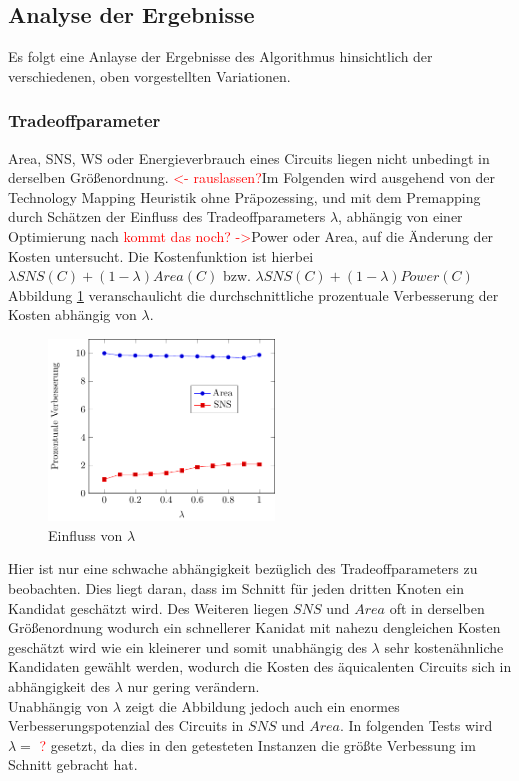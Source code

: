 \documentclass[11pt, a4paper, german]{article}
\newcommand{\TM}{Technology  Mapping }
\begin{document}
 \subsection{Analyse der Ergebnisse}
 \label{subsec:analyse_der_ergebnisse}
 Es folgt eine Anlayse der Ergebnisse des Algorithmus hinsichtlich der verschiedenen, oben vorgestellten Variationen.
\subsubsection{Tradeoffparameter}
Area, SNS, WS oder Energieverbrauch eines Circuits liegen nicht unbedingt in derselben Größenordnung. \textcolor{red}{<- rauslassen?}Im Folgenden wird ausgehend von der \TM Heuristik ohne Präpozessing, und mit dem Premapping durch Sch\"atzen der Einfluss des Tradeoffparameters $\lambda$, abhängig von einer Optimierung nach \textcolor{red}{kommt das noch? ->}Power oder Area,  auf die Änderung der Kosten untersucht.  Die Kostenfunktion ist hierbei $\lambda SNS(C) + (1-\lambda)Area(C)$ bzw. $\lambda SNS(C) + (1-\lambda)Power(C)$\\
Abbildung \ref{bild:area_slack_tradeoff} veranschaulicht die durchschnittliche prozentuale Verbesserung der Kosten abhängig von $\lambda$.\\
   \begin{figure}
		\includegraphics[width = 6cm]{pictures/tex_files/analysis/tradeoff_curve}
		\caption{Einfluss von $\lambda$}
		\label{bild:area_slack_tradeoff}
	\end{figure}
Hier ist nur eine schwache abh\"angigkeit bez\"uglich des Tradeoffparameters zu beobachten. Dies liegt daran, dass im Schnitt f\"ur jeden dritten Knoten ein Kandidat gesch\"atzt wird. Des Weiteren liegen $SNS$ und $Area$ oft in derselben Gr\"o\ss enordnung wodurch ein schnellerer Kanidat mit nahezu dengleichen Kosten gesch\"atzt wird wie ein kleinerer und somit unabhängig des $\lambda$ sehr kosten\"ahnliche Kandidaten gew\"ahlt werden, wodurch die Kosten des \"aquicalenten Circuits sich in abh\"angigkeit des $\lambda$ nur gering ver\"andern.\\
Unabh\"angig von $\lambda$ zeigt die Abbildung jedoch auch ein enormes Verbesserungspotenzial des Circuits in $SNS$ und $Area$. In folgenden Tests wird $\lambda = $ \textcolor{red}{?} gesetzt, da dies in den getesteten Instanzen die gr\"o\ss te Verbessung im Schnitt gebracht hat.\\
\end{document}
